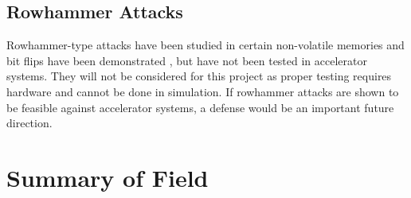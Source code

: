 \documentclass[sigconf,authoryear]{acmart}
\begin{document}
\subsection{Rowhammer Attacks}
Rowhammer-type attacks have been studied in certain non-volatile memories and bit flips have been demonstrated \cite{neurohammer}, but have not been tested 
in accelerator systems. They will not be considered for this project as proper testing requires hardware and cannot be done in simulation. 
If rowhammer attacks are shown to be feasible against accelerator systems, a defense would be an important future direction.

\section{Summary of Field}
\begin{comment}
    - field summary
    - paragraph
\end{comment}




\end{document}
